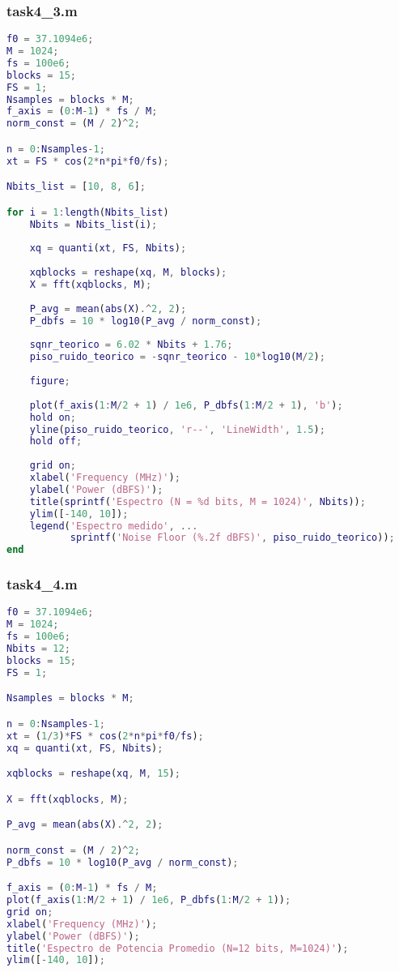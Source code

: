 \subsubsection{task4\_3.m}
\begin{lstlisting}[language=Matlab]
f0 = 37.1094e6;
M = 1024;
fs = 100e6;
blocks = 15;
FS = 1;
Nsamples = blocks * M;
f_axis = (0:M-1) * fs / M;
norm_const = (M / 2)^2; 

n = 0:Nsamples-1;
xt = FS * cos(2*n*pi*f0/fs);

Nbits_list = [10, 8, 6];

for i = 1:length(Nbits_list)
    Nbits = Nbits_list(i);
    
    xq = quanti(xt, FS, Nbits);
    
    xqblocks = reshape(xq, M, blocks);
    X = fft(xqblocks, M);
    
    P_avg = mean(abs(X).^2, 2);
    P_dbfs = 10 * log10(P_avg / norm_const);
    
    sqnr_teorico = 6.02 * Nbits + 1.76;
    piso_ruido_teorico = -sqnr_teorico - 10*log10(M/2);
    
    figure;
    
    plot(f_axis(1:M/2 + 1) / 1e6, P_dbfs(1:M/2 + 1), 'b');
    hold on;
    yline(piso_ruido_teorico, 'r--', 'LineWidth', 1.5);
    hold off;
    
    grid on;
    xlabel('Frequency (MHz)');
    ylabel('Power (dBFS)');
    title(sprintf('Espectro (N = %d bits, M = 1024)', Nbits));
    ylim([-140, 10]);
    legend('Espectro medido', ...
           sprintf('Noise Floor (%.2f dBFS)', piso_ruido_teorico));
end
\end{lstlisting}


\subsubsection{task4\_4.m}
\begin{lstlisting}[language=Matlab]
f0 = 37.1094e6;
M = 1024;
fs = 100e6;
Nbits = 12;
blocks = 15;
FS = 1;

Nsamples = blocks * M;

n = 0:Nsamples-1;
xt = (1/3)*FS * cos(2*n*pi*f0/fs);
xq = quanti(xt, FS, Nbits);

xqblocks = reshape(xq, M, 15);

X = fft(xqblocks, M);

P_avg = mean(abs(X).^2, 2);

norm_const = (M / 2)^2;
P_dbfs = 10 * log10(P_avg / norm_const);

f_axis = (0:M-1) * fs / M; 
plot(f_axis(1:M/2 + 1) / 1e6, P_dbfs(1:M/2 + 1));
grid on;
xlabel('Frequency (MHz)');
ylabel('Power (dBFS)');
title('Espectro de Potencia Promedio (N=12 bits, M=1024)');
ylim([-140, 10]);
\end{lstlisting}

